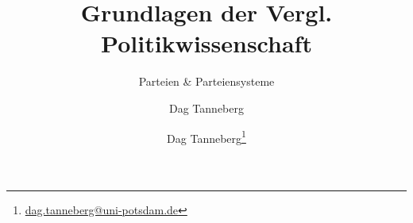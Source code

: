 \usepackage[ngerman]{babel}
\usepackage[utf8]{inputenc}
\usepackage{graphicx}
\usepackage{hyperref}
\usepackage{multirow}
\usepackage{booktabs}
\usepackage{tikz}
  \usetikzlibrary{positioning}
  \usetikzlibrary{calc}
  \usetikzlibrary{matrix}
\usepackage{adjustbox}
\usepackage{tikzscale}
\usepackage{harveyballs}

\author{Dag Tanneberg}
\title{Grundlagen der Vergl. Politikwissenschaft}
\subtitle{Parteien \& Parteiensysteme}
\author{Dag Tanneberg\thanks{%
  \href{mailto:dag.tanneberg@uni-potsdam.de}%
    {dag.tanneberg@uni-potsdam.de}
  }
}
\hypersetup{colorlinks, urlcolor = red, linkcolor = }

